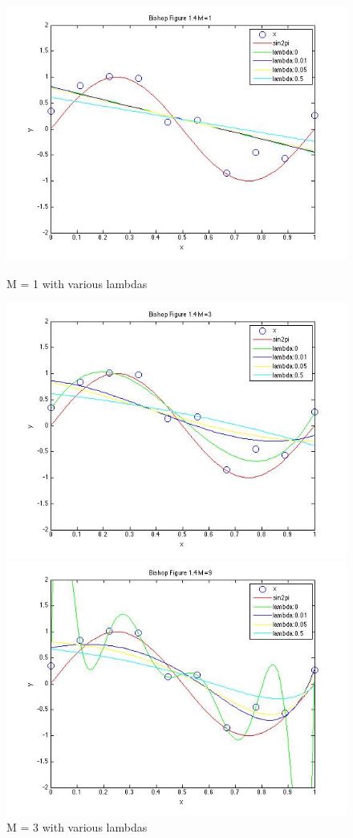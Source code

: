 \begin{figure}[!htb]
  \includegraphics[width=\linewidth]{figures/p3_bishop_m=1}
  \caption{M = 1 with various lambdas}\label{fig:figures/p3_bishop_m=1}
\endminipage\hfill
{}
  \includegraphics[width=\linewidth]{figures/p3_bishop_m=3}
  \caption{M = 3 with various lambdas}\label{fig:figures/p3_bishop_m=3}
\endminipage\hfill
{}%
  \includegraphics[width=\linewidth]{figures/p3_bishop_m=9}

\end{figure}
